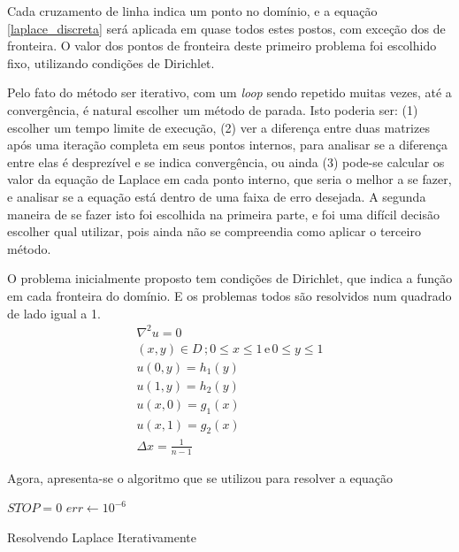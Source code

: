 \documentclass[journal]{IEEEtran}
\begin{document}
Cada cruzamento de linha indica um ponto no domínio, e a equação \ref{laplace_discreta} será aplicada em quase todos estes postos, com exceção dos de fronteira. O valor dos pontos de fronteira deste primeiro problema foi escolhido fixo, utilizando condições de Dirichlet. 

Pelo fato do método ser iterativo, com um \textit{loop} sendo repetido muitas vezes, até a convergência, é natural escolher um método de parada. Isto poderia ser: (1) escolher um tempo limite de execução, (2) ver a diferença entre duas matrizes após uma iteração completa em seus pontos internos, para analisar se a diferença entre elas é desprezível e se indica convergência, ou ainda (3) pode-se calcular os valor da equação de Laplace em cada ponto interno, que seria o melhor a se fazer, e analisar se a equação está dentro de uma faixa de erro desejada. A segunda maneira de se fazer isto foi escolhida na primeira parte, e foi uma difícil decisão escolher qual utilizar, pois ainda não se compreendia como aplicar o terceiro método.

O problema inicialmente proposto tem condições de Dirichlet, que indica a função em cada fronteira do domínio. E os problemas todos são resolvidos num quadrado de lado igual a 1.
\begin{eqnarray}
\nabla^2 u=0 \\
(x,y) \in D\,; 0\le x\le 1\,\textrm{e}\,0\le y\le 1 \nonumber \\
u(0,y)=h_1(y) \nonumber \\
u(1,y)=h_2(y) \nonumber \\
u(x,0)=g_1(x) \nonumber \\
u(x,1)=g_2(x) \nonumber \\
\Delta x = \frac{1}{n-1} \nonumber
\end{eqnarray}

Agora, apresenta-se o algoritmo que se utilizou para resolver a equação
\begin{algorithm}
\BlankLine
$STOP=0$\;
$err \leftarrow 10^{-6}$\;

\caption{Resolvendo Laplace Iterativamente}\label{algo_laplace_iter}
\end{algorithm}
\end{document}
